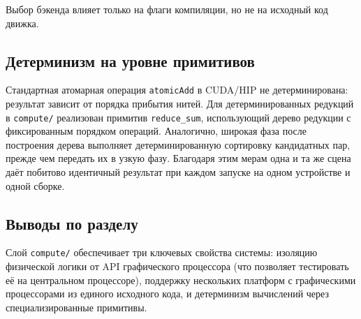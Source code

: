 Выбор бэкенда влияет только на флаги компиляции, но не на исходный код движка.

\subsection{Детерминизм на уровне примитивов}

Стандартная атомарная операция \texttt{atomicAdd} в CUDA/HIP не детерминирована: результат зависит от порядка 
прибытия нитей. Для детерминированных редукций в \texttt{compute/} реализован примитив \texttt{reduce\_sum}, 
использующий дерево редукции с фиксированным порядком операций. Аналогично, широкая фаза после построения 
дерева выполняет детерминированную сортировку кандидатных пар, прежде чем передать их в узкую фазу. Благодаря 
этим мерам одна и та же сцена даёт побитово идентичный результат при каждом запуске на одном устройстве и 
одной сборке.

\subsection{Выводы по разделу}

Слой \texttt{compute/} обеспечивает три ключевых свойства системы: изоляцию физической логики от API графического процессора (что
позволяет тестировать её на центральном процессоре), поддержку нескольких платформ с графическими процессорами из единого исходного кода, и детерминизм
вычислений через специализированные примитивы.
